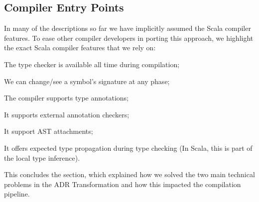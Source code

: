 


\subsection{Compiler Entry Points}
\label{sec:ildl:scala}

In many of the descriptions so far we have implicitly assumed the Scala compiler features. To ease other compiler developers in porting this approach, we highlight the exact Scala compiler features that we rely on:
%
\begin{compactitem}
  \item The type checker is available all time during compilation;
  \item We can change/see a symbol's signature at any phase;
  \item The compiler supports type annotations;
  \item It supports external annotation checkers;
  \item It support AST attachments;
  \item It offers expected type propagation during type checking (In Scala, this is part of the local type inference).
\end{compactitem}

This concludes the section, which explained how we solved the two main technical problems in the ADR Transformation and how this impacted the compilation pipeline.
